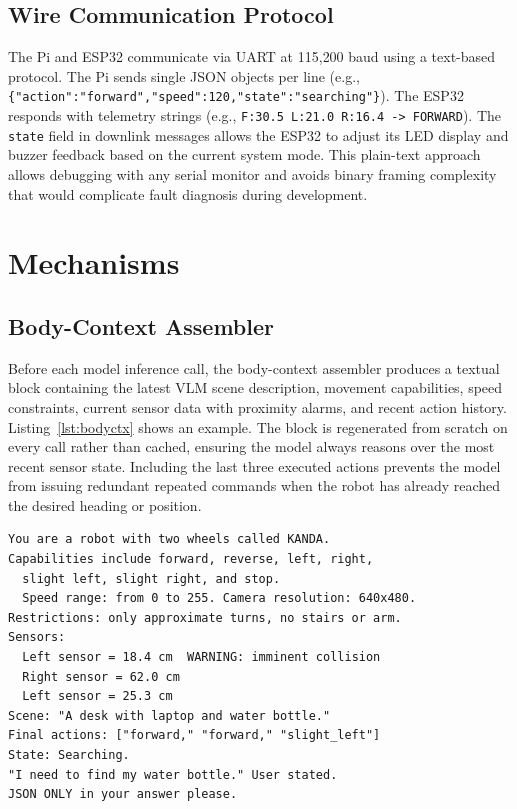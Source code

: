 \documentclass[conference]{IEEEtran}
\begin{document}
\subsection{Wire Communication Protocol}

The Pi and ESP32 communicate via UART at 115{,}200 baud using a text-based protocol. The Pi sends single JSON objects per line (e.g., {\scriptsize\texttt{\{"action":"forward","speed":120,"state":"searching"\}}}). The ESP32 responds with telemetry strings (e.g., {\scriptsize\texttt{F:30.5 L:21.0 R:16.4 -> FORWARD}}). The \texttt{state} field in downlink messages allows the ESP32 to adjust its LED display and buzzer feedback based on the current system mode. This plain-text approach allows debugging with any serial monitor and avoids binary framing complexity that would complicate fault diagnosis during development.

\section{Mechanisms}
\label{sec:methodology}

\subsection{Body-Context Assembler}
\label{sec:bodyctx}

Before each model inference call, the body-context assembler produces a textual block containing the latest VLM scene description, movement capabilities, speed constraints, current sensor data with proximity alarms, and recent action history. Listing~\ref{lst:bodyctx} shows an example. The block is regenerated from scratch on every call rather than cached, ensuring the model always reasons over the most recent sensor state. Including the last three executed actions prevents the model from issuing redundant repeated commands when the robot has already reached the desired heading or position.

\begin{lstlisting}[caption={Body-context block (rebuilt each inference call)},
  label={lst:bodyctx}, float=tp]
You are a robot with two wheels called KANDA.
Capabilities include forward, reverse, left, right,
  slight left, slight right, and stop.
  Speed range: from 0 to 255. Camera resolution: 640x480.
Restrictions: only approximate turns, no stairs or arm.
Sensors:
  Left sensor = 18.4 cm  WARNING: imminent collision
  Right sensor = 62.0 cm
  Left sensor = 25.3 cm
Scene: "A desk with laptop and water bottle."
Final actions: ["forward," "forward," "slight_left"]
State: Searching.
"I need to find my water bottle." User stated.
JSON ONLY in your answer please.
\end{lstlisting}
\end{document}
